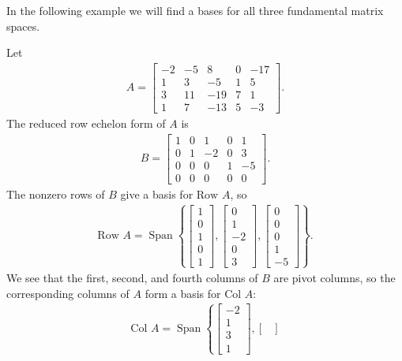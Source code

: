 \documentclass[12pt,letterpaper,reqno]{article}
\numberwithin{equation}{section}
\newcommand{\Col}{\text{Col }}
\newcommand{\Row}{\text{Row }}
\DeclareMathOperator{\Span}{Span}
\begin{document}
In the following example we will find a bases for all three fundamental matrix spaces.
\begin{example}
Let 
\begin{align*}
	A=\begin{bmatrix}
		-2 & -5 & 8 & 0 & -17 \\
		1 & 3 & -5 & 1 & 5 \\
		3 & 11 & -19 & 7 & 1 \\
		1 & 7 & -13 & 5 & -3
	\end{bmatrix}.
\end{align*}	
The reduced row echelon form of $A$ is
\begin{align*}
	B=\begin{bmatrix}
		1 & 0 & 1 & 0 & 1 \\
		0 & 1 & -2 & 0 & 3 \\
		0 & 0 & 0 & 1 & -5 \\
		0 & 0 & 0 & 0 & 0
	\end{bmatrix}.
\end{align*}
The nonzero rows of $B$ give a basis for $\Row A$, so
\begin{align*}
	\Row A=\Span\left\{\begin{bmatrix}
		1 \\ 0 \\ 1 \\ 0 \\ 1
	\end{bmatrix}, \begin{bmatrix}
		0 \\ 1 \\ -2 \\ 0 \\ 3
	\end{bmatrix}, \begin{bmatrix}
		0 \\ 0 \\ 0\\ 1 \\ -5
	\end{bmatrix}\right\}.
\end{align*}
We see that the first, second, and fourth columns of $B$ are pivot columns, so the corresponding columns of $A$ form a basis for $\Col A$:
\begin{align*}
	\Col A=\Span \left\{\begin{bmatrix}
		-2 \\ 1  \\ 3 \\ 1
	\end{bmatrix}, \begin{bmatrix}

\end{bmatrix}
\end{align*}
\end{example}
\end{document}

